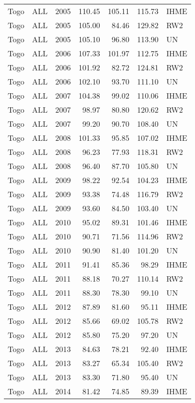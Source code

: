 \begin{longtable}{lllrrrl}
  Togo & ALL & 2005 & 110.45 & 105.11 & 115.73 & IHME \\ 
  Togo & ALL & 2005 & 105.00 & 84.46 & 129.82 & RW2 \\ 
  Togo & ALL & 2005 & 105.10 & 96.80 & 113.90 & UN \\ 
  Togo & ALL & 2006 & 107.33 & 101.97 & 112.75 & IHME \\ 
  Togo & ALL & 2006 & 101.92 & 82.72 & 124.81 & RW2 \\ 
  Togo & ALL & 2006 & 102.10 & 93.70 & 111.10 & UN \\ 
  Togo & ALL & 2007 & 104.38 & 99.02 & 110.06 & IHME \\ 
  Togo & ALL & 2007 & 98.97 & 80.80 & 120.62 & RW2 \\ 
  Togo & ALL & 2007 & 99.20 & 90.70 & 108.40 & UN \\ 
  Togo & ALL & 2008 & 101.33 & 95.85 & 107.02 & IHME \\ 
  Togo & ALL & 2008 & 96.23 & 77.93 & 118.31 & RW2 \\ 
  Togo & ALL & 2008 & 96.40 & 87.70 & 105.80 & UN \\ 
  Togo & ALL & 2009 & 98.22 & 92.54 & 104.23 & IHME \\ 
  Togo & ALL & 2009 & 93.38 & 74.48 & 116.79 & RW2 \\ 
  Togo & ALL & 2009 & 93.60 & 84.50 & 103.40 & UN \\ 
  Togo & ALL & 2010 & 95.02 & 89.31 & 101.46 & IHME \\ 
  Togo & ALL & 2010 & 90.71 & 71.56 & 114.96 & RW2 \\ 
  Togo & ALL & 2010 & 90.90 & 81.40 & 101.20 & UN \\ 
  Togo & ALL & 2011 & 91.41 & 85.36 & 98.29 & IHME \\ 
  Togo & ALL & 2011 & 88.18 & 70.27 & 110.14 & RW2 \\ 
  Togo & ALL & 2011 & 88.30 & 78.30 & 99.10 & UN \\ 
  Togo & ALL & 2012 & 87.89 & 81.60 & 95.11 & IHME \\ 
  Togo & ALL & 2012 & 85.66 & 69.02 & 105.78 & RW2 \\ 
  Togo & ALL & 2012 & 85.80 & 75.20 & 97.20 & UN \\ 
  Togo & ALL & 2013 & 84.63 & 78.21 & 92.40 & IHME \\ 
  Togo & ALL & 2013 & 83.27 & 65.34 & 105.40 & RW2 \\ 
  Togo & ALL & 2013 & 83.30 & 71.80 & 95.40 & UN \\ 
  Togo & ALL & 2014 & 81.42 & 74.85 & 89.39 & IHME \\ 

\end{longtable}
